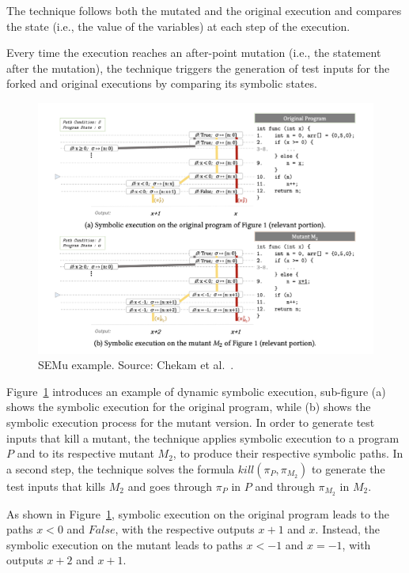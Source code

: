 The technique follows both the mutated and the original execution and compares the state (i.e., the value of the variables) at each step of the execution.

Every time the execution reaches an after-point mutation (i.e., the statement after the mutation), the technique triggers the generation of test inputs for the forked and original executions by comparing its symbolic states.

\begin{figure}[tb]
\begin{center}
\includegraphics[width=\textwidth]{images/semu-example}
\caption{SEMu example. Source: Chekam et al.~\cite{chekam2021killing}.}
\label{fig:semu-example}
\end{center}
\end{figure}

Figure~\ref{fig:semu-example} introduces an example of dynamic symbolic execution, sub-figure (a) shows the symbolic execution for the original program, while (b) shows the symbolic execution process for the mutant version. In order to generate test inputs that kill a mutant, the technique applies symbolic execution to a program $P$ and to its respective mutant $M_2$, to produce their respective symbolic paths. In a second step, the technique solves the formula $kill(\pi_P, \pi_{M_2})$ to generate the test inputs that kills $M_2$ and goes through $\pi_P$ in $P$ and through $\pi_{M_2}$ in $M_2$. 

As shown in Figure~\ref{fig:semu-example}, symbolic execution on the original program leads to the paths $x < 0$ and $False$, with the respective outputs $x + 1$ and $x$.
Instead, the symbolic execution on the mutant leads to paths $x < -1$ and $x = -1$, with outputs $x + 2$ and $x + 1$.

